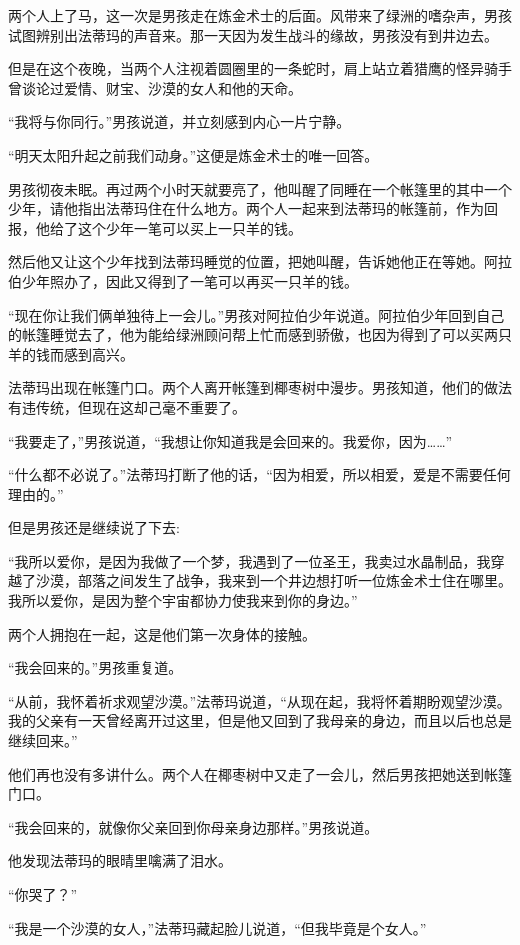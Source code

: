 \documentclass[twoside,openany]{book}
\begin{document}
两个人上了马，这一次是男孩走在炼金术士的后面。风带来了绿洲的嗜杂声，男孩试图辨别出法蒂玛的声音来。那一天因为发生战斗的缘故，男孩没有到井边去。

但是在这个夜晚，当两个人注视着圆圈里的一条蛇时，肩上站立着猎鹰的怪异骑手曾谈论过爱情、财宝、沙漠的女人和他的天命。

“我将与你同行。”男孩说道，并立刻感到内心一片宁静。

“明天太阳升起之前我们动身。”这便是炼金术士的唯一回答。

男孩彻夜未眠。再过两个小时天就要亮了，他叫醒了同睡在一个帐篷里的其中一个少年，请他指出法蒂玛住在什么地方。两个人一起来到法蒂玛的帐篷前，作为回报，他给了这个少年一笔可以买上一只羊的钱。

然后他又让这个少年找到法蒂玛睡觉的位置，把她叫醒，告诉她他正在等她。阿拉伯少年照办了，因此又得到了一笔可以再买一只羊的钱。

“现在你让我们俩单独待上一会儿。”男孩对阿拉伯少年说道。阿拉伯少年回到自己的帐篷睡觉去了，他为能给绿洲顾问帮上忙而感到骄傲，也因为得到了可以买两只羊的钱而感到高兴。

法蒂玛出现在帐篷门口。两个人离开帐篷到椰枣树中漫步。男孩知道，他们的做法有违传统，但现在这却己毫不重要了。

“我要走了，”男孩说道，“我想让你知道我是会回来的。我爱你，因为……”

“什么都不必说了。”法蒂玛打断了他的话，“因为相爱，所以相爱，爱是不需要任何理由的。”

但是男孩还是继续说了下去:

“我所以爱你，是因为我做了一个梦，我遇到了一位圣王，我卖过水晶制品，我穿越了沙漠，部落之间发生了战争，我来到一个井边想打听一位炼金术士住在哪里。我所以爱你，是因为整个宇宙都协力使我来到你的身边。”

两个人拥抱在一起，这是他们第一次身体的接触。

“我会回来的。”男孩重复道。

“从前，我怀着祈求观望沙漠。”法蒂玛说道，“从现在起，我将怀着期盼观望沙漠。我的父亲有一天曾经离开过这里，但是他又回到了我母亲的身边，而且以后也总是继续回来。”

他们再也没有多讲什么。两个人在椰枣树中又走了一会儿，然后男孩把她送到帐篷门口。

“我会回来的，就像你父亲回到你母亲身边那样。”男孩说道。

他发现法蒂玛的眼晴里噙满了泪水。

“你哭了？”

“我是一个沙漠的女人，”法蒂玛藏起脸儿说道，“但我毕竟是个女人。”
\end{document}
